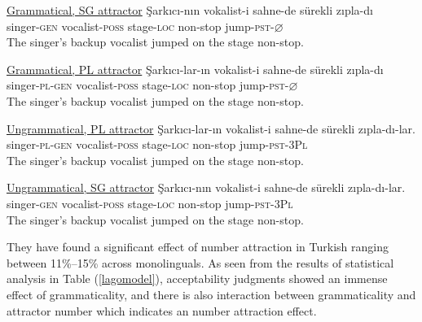 \documentclass[11pt,a4paper]{article}
\begin{document}
\begin{exe}
\ex
\begin{xlist}
\ex \underline{Grammatical, SG attractor} \label{lago1}
\gll \c{S}ark{\i}c{\i}-n{\i}n vokalist-i sahne-de s\"{u}rekli z{\i}pla-d{\i}\\
singer-\textsc{gen} vocalist-\textsc{poss} stage-\textsc{loc} non-stop jump-\textsc{pst}-$\varnothing$\\
\glt The singer's backup vocalist jumped on the stage non-stop.

\ex \underline{Grammatical, PL attractor} \label{lago2}
\gll \c{S}ark{\i}c{\i}-lar-{\i}n vokalist-i sahne-de s\"{u}rekli z{\i}pla-d{\i}\\
singer-\textsc{pl}-\textsc{gen} vocalist-\textsc{poss} stage-\textsc{loc} non-stop jump-\textsc{pst}-$\varnothing$\\
\glt The singer's backup vocalist jumped on the stage non-stop.

\ex \underline{Ungrammatical, PL attractor} \label{lago3}
\gll \c{S}ark{\i}c{\i}-lar-{\i}n vokalist-i sahne-de s\"{u}rekli z{\i}pla-d{\i}-lar.\\
singer-\textsc{pl}-\textsc{gen} vocalist-\textsc{poss} stage-\textsc{loc} non-stop jump-\textsc{pst}-\textsc{3Pl}\\
\glt The singer's backup vocalist jumped on the stage non-stop.

\ex \underline{Ungrammatical, SG attractor} \label{lago4}
\gll \c{S}ark{\i}c{\i}-n{\i}n vokalist-i sahne-de s\"{u}rekli z{\i}pla-d{\i}-lar.\\
singer-\textsc{gen} vocalist-\textsc{poss} stage-\textsc{loc} non-stop jump-\textsc{pst}-\textsc{3Pl}\\
\glt The singer's backup vocalist jumped on the stage non-stop.
\end{xlist}
\end{exe}

They have found a significant effect of number attraction in Turkish
ranging between 11\%--15\% across monolinguals. As seen from the results
of statistical analysis in Table (\ref{lagomodel}), acceptability
judgments showed an immense effect of grammaticality, and there is also
interaction between grammaticality and attractor number which indicates
an number attraction effect.
\end{document}
